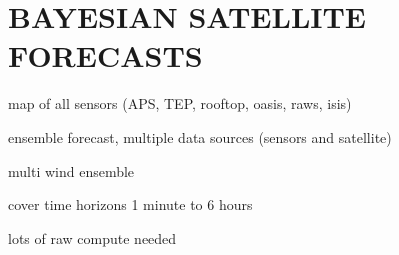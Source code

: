 \chapter{BAYESIAN SATELLITE FORECASTS}
\label{chap:satfx}

map of all sensors (APS, TEP, rooftop, oasis, raws, isis)

ensemble forecast, multiple data sources (sensors and satellite)

multi wind ensemble

cover time horizons 1 minute to 6 hours

lots of raw compute needed


